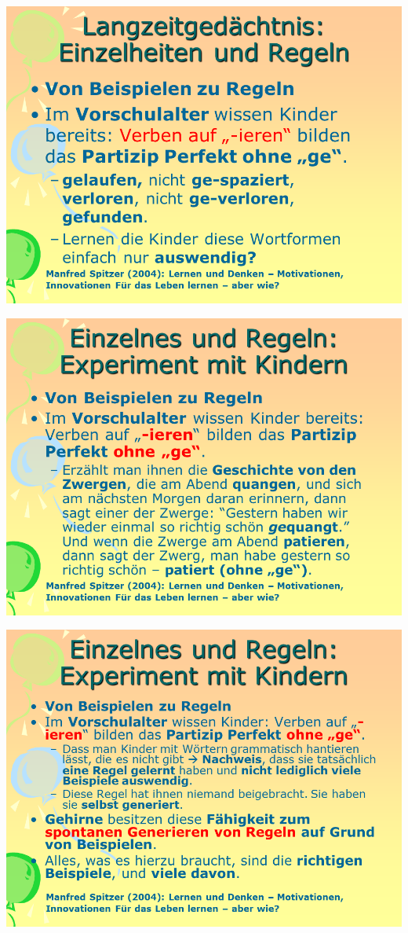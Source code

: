 \documentclass[
  letterpaper,
]{scrbook}
\begin{document}
\includegraphics[width=1\textwidth,height=\textheight]{./pictures/neuro/Diapozitiv46.PNG}

\includegraphics[width=1\textwidth,height=\textheight]{./pictures/neuro/Diapozitiv47.PNG}

\includegraphics[width=1\textwidth,height=\textheight]{./pictures/neuro/Diapozitiv48.PNG}
\end{document}
